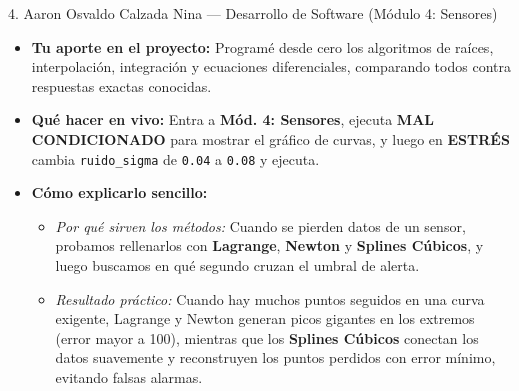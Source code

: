 \documentclass[11pt,a4paper]{article}
\begin{document}
\begin{tarjeta}{4. Aaron Osvaldo Calzada Nina — Desarrollo de Software (Módulo 4: Sensores)}
\begin{itemize}[noitemsep]
    \item \textbf{Tu aporte en el proyecto:} Programé desde cero los algoritmos de raíces, interpolación, integración y ecuaciones diferenciales, comparando todos contra respuestas exactas conocidas.
    \item \textbf{Qué hacer en vivo:} Entra a \textbf{Mód. 4: Sensores}, ejecuta \textbf{MAL CONDICIONADO} para mostrar el gráfico de curvas, y luego en \textbf{ESTRÉS} cambia \texttt{ruido\_sigma} de \texttt{0.04} a \texttt{0.08} y ejecuta.
    \item \textbf{Cómo explicarlo sencillo:}
    \begin{itemize}[noitemsep]
        \item \textit{Por qué sirven los métodos:} Cuando se pierden datos de un sensor, probamos rellenarlos con \textbf{Lagrange}, \textbf{Newton} y \textbf{Splines Cúbicos}, y luego buscamos en qué segundo cruzan el umbral de alerta.
        \item \textit{Resultado práctico:} Cuando hay muchos puntos seguidos en una curva exigente, Lagrange y Newton generan picos gigantes en los extremos (error mayor a 100), mientras que los \textbf{Splines Cúbicos} conectan los datos suavemente y reconstruyen los puntos perdidos con error mínimo, evitando falsas alarmas.
    \end{itemize}
\end{itemize}
\end{tarjeta}
\end{document}
